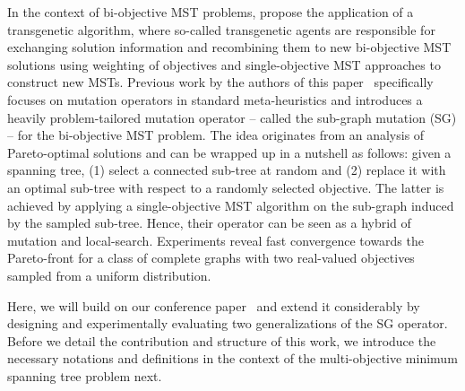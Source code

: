 \documentclass[twoside]{article}
\begin{document}
In the context of bi-objective MST problems, \citet{FernandesMGG2019} propose the application of a transgenetic algorithm, where so-called transgenetic agents are responsible for exchanging solution information and recombining them to new bi-objective MST solutions using weighting of objectives and single-objective MST approaches to construct new MSTs. Previous work by the authors of this paper~\citep{BG2017ParetoBeneficial} specifically focuses on mutation operators in standard meta-heuristics and introduces a heavily problem-tailored mutation operator -- called the sub-graph mutation (SG) -- for the bi-objective MST problem. The idea originates from an analysis of Pareto-optimal solutions and can be wrapped up in a nutshell as follows: given a spanning tree, (1) select a connected sub-tree at random and (2) replace it with an optimal sub-tree with respect to a randomly selected objective. The latter is achieved by applying a single-objective MST algorithm on the sub-graph induced by the sampled sub-tree. Hence, their operator can be seen as a hybrid of mutation and local-search. Experiments reveal fast convergence towards the Pareto-front for a class of complete graphs with two real-valued objectives sampled from a uniform distribution.

Here, we will build on our conference paper~\citep{BG2017ParetoBeneficial} and extend it considerably by designing and experimentally evaluating two generalizations of the SG operator. Before we detail the contribution and structure of this work, we introduce the necessary notations and definitions in the context of the multi-objective minimum spanning tree problem next.


\end{document}
